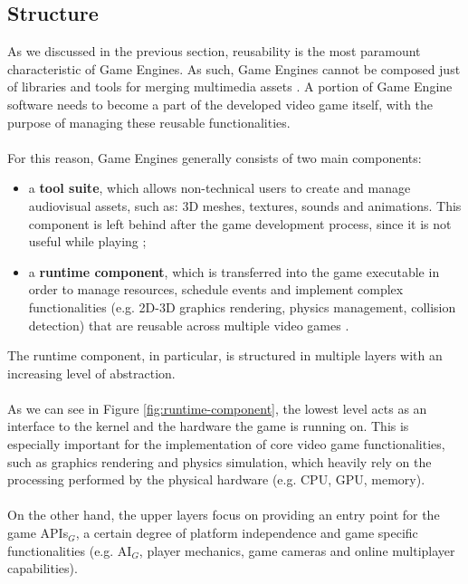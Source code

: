 \subsection{Structure}
As we discussed in the previous section, reusability is the most paramount characteristic of Game Engines. As such, Game Engines cannot be composed just of libraries and tools for merging multimedia assets \cite{womak:revamping-cloud-games}. A portion of Game Engine software needs to become a part of the developed video game itself, with the purpose of managing these reusable functionalities. \\ \\
For this reason, Game Engines generally consists of two main components:
\begin{itemize}
	\item a \textbf{tool suite}, which allows non-technical users to create and manage audiovisual assets, such as: 3D meshes, textures, sounds and animations. This component is left behind after the game development process, since it is not useful while playing \cite{womak:distributed-cloud-gaming-pipeline};
	\item a \textbf{runtime component}, which is transferred into the game executable in order to manage resources, schedule events and implement complex functionalities (e.g. 2D-3D graphics rendering, physics management, collision detection) that are reusable across multiple video games \cite{womak:gregory-game-engine, womak:revamping-cloud-games}.
\end{itemize}
The runtime component, in particular, is structured in multiple layers with an increasing level of abstraction. \cite{womak:revamping-cloud-games} \\ \\
As we can see in Figure \ref{fig:runtime-component}, the lowest level acts as an interface to the kernel and the hardware the game is running on. This is especially important for the implementation of core video game functionalities, such as graphics rendering and physics simulation, which heavily rely on the processing performed by the physical hardware (e.g. CPU, GPU, memory). \\ \\
On the other hand, the upper layers focus on providing an entry point for the game APIs$_G$, a certain degree of platform independence and game specific functionalities (e.g. AI$_G$, player mechanics, game cameras and online multiplayer capabilities).
